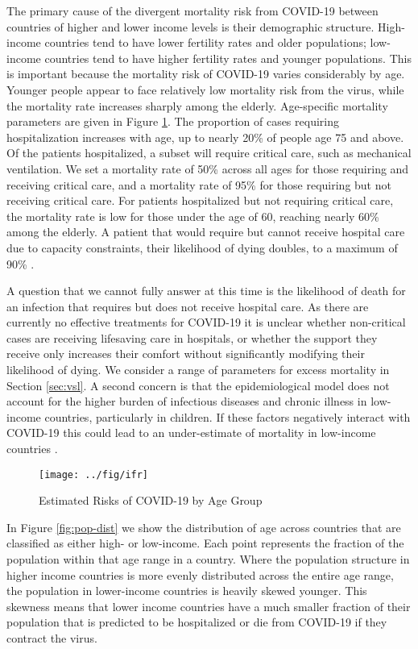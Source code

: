 \documentclass[11pt]{article}
\begin{document}
The primary cause of the divergent mortality risk from COVID-19 between countries of higher and lower income levels is their demographic structure. High-income countries tend to have lower fertility rates and older populations; low-income countries tend to have higher fertility rates and younger populations. This is important because the mortality risk of COVID-19 varies considerably by age. Younger people appear to face relatively low mortality risk from the virus, while the mortality rate increases sharply among the elderly. Age-specific mortality parameters are given in Figure \ref{fig:ifr}. The proportion of cases requiring hospitalization increases with age, up to nearly 20\% of people age 75 and above. Of the patients hospitalized, a subset will require critical care, such as mechanical ventilation. We set a mortality rate of 50\% across all ages for those requiring and receiving critical care, and a mortality rate of 95\% for those requiring but not receiving critical care. For patients hospitalized but not requiring critical care, the mortality rate is low for those under the age of 60, reaching nearly 60\% among the elderly. A patient that would require but cannot receive hospital care due to capacity constraints, their likelihood of dying doubles, to a maximum of 90\% \parencite{verity2020,squire}.


A question that we cannot fully answer at this time is the likelihood of death for an infection that requires but does not receive hospital care. As there are currently no effective treatments for COVID-19 it is unclear whether non-critical cases are receiving lifesaving care in hospitals, or whether the support they receive only increases their comfort without significantly modifying their likelihood of dying. We consider a range of parameters for excess mortality in Section \ref{sec:vsl}. A second concern is that the epidemiological model does not account for the higher burden of infectious diseases and chronic illness in low-income countries, particularly in children. If these factors negatively interact with COVID-19 this could lead to an under-estimate of mortality in low-income countries \parencite{walker2020,squire}. 

\begin{figure}
\centering
\caption{Estimated Risks of COVID-19 by Age Group}
\texttt{[image: ../fig/ifr]}
\label{fig:ifr}
\end{figure}

In Figure \ref{fig:pop-dist} we show the distribution of age across countries that are classified as either high- or low-income. Each point represents the fraction of the population within that age range in a country. Where the population structure in higher income countries is more evenly distributed across the entire age range, the population in lower-income countries is heavily skewed younger. This skewness means that lower income countries have a much smaller fraction of their population that is predicted to be hospitalized or die from COVID-19 if they contract the virus.
\end{document}
